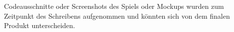 \documentclass[
    headings=optiontotocandhead,%
    twoside,
    numbers=noenddot,%
    toc=flat, %
    12pt, %
    titlepage, %
    parskip=full, %
    listof=totoc, %
    listof=flat, %
    numbers=noenddot, %
    bibliography=totoc, %
    a4paper,DIV=14,
    BCOR=15mm,
]{scrbook}
\begin{document}
Codeausschnitte oder Screenshots des Spiels oder Mockups wurden zum Zeitpunkt des Schreibens aufgenommen und könnten
sich von dem finalen Produkt unterscheiden.

\cleardoublepage{}
\tableofcontents{}
\cleardoublepage{}
\listoffigures


\cleardoublepage{}
\mainmatter

%
%
%
%

%
%
%
%
%
%
%
%
%


\appendix
\end{document}

